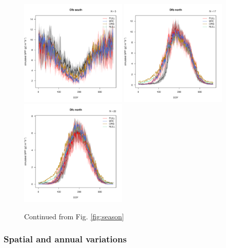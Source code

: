 \documentclass{myreport}
\begin{document}
 \begin{figure}[!ht]
\includegraphics[width=0.45\textwidth]{fig/meandoy_byzone_Cfb_south_.pdf}
\includegraphics[width=0.45\textwidth]{fig/meandoy_byzone_Dfb_north_.pdf}\\
\includegraphics[width=0.45\textwidth]{fig/meandoy_byzone_Dfc_north_.pdf}
    \caption{Continued from Fig. \ref{fig:season}}
    \label{fig:season2}
\end{figure}

\clearpage

\subsubsection{Spatial and annual variations}
\end{document}

